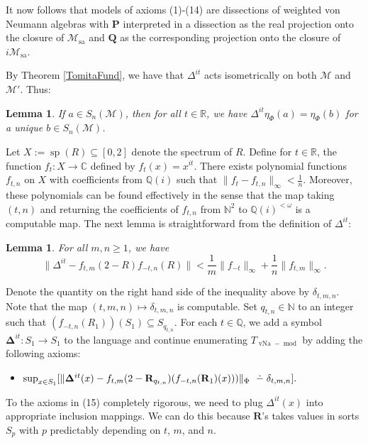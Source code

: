 \documentclass[12pt]{amsart}
\newtheorem{lem}[thm]{Lemma}
\theoremstyle{definition}
\newcommand{\dminus}{ 
\buildrel\textstyle\ .\over{\hbox{ 
\vrule height3pt depth0pt width0pt}{\smash-} 
}}
\def\cal{\mathcal}
\def \md{\operatorname{mod}}
\DeclareMathOperator{\vNa}{vNa}
\DeclareMathOperator{\spec}{sp}
\def \sa{\operatorname{sa}}
\def \vP{\mathbf{P}}
\def \vQ{\mathbf{Q}}
\def \vR{\mathbf{R}}
\def \bbC{\mathbb{C}}
\def \bbR{\mathbb{R}}
\def \bbQ{\mathbb{Q}}
\def \bbN{\mathbb{N}}
\begin{document}
It now follows that models of axioms (1)-(14) are dissections of weighted von Neumann algebras with $\vP$ interpreted in a dissection as the real projection onto the closure of $\cal M_{\sa}$ and $\vQ$ as the corresponding projection onto the closure of $i\cal M_{\sa}$. 

By Theorem \ref{TomitaFund}, we have that $\Delta^{it}$ acts isometrically on both $\cal M$ and $\cal M'$. Thus:

\begin{lem}
    If $a\in S_n(\cal M)$, then for all $t\in \bbR$, we have $\Delta^{it} \eta_{\Phi}(a) = \eta_{\Phi}(b)$ for a unique $b \in S_n(\cal M)$.
\end{lem}

Let $X := \spec (R) \subseteq [0,2]$ denote the spectrum of $R$.  Define for $t \in \bbR$, the function $f_t : X \to \bbC$ defined by $f_t(x) = x^{it}$.  There exists polynomial functions $f_{t,n}$ on $X$ with coefficients from $\bbQ(i)$ such that $\|f_t - f_{t,n}\|_\infty < \frac{1}{n}$.  Moreover, these polynomials can be found effectively in the sense that the map taking $(t,n)$ and returning the coefficients of $f_{t,n}$ from $\bbN^2$ to $\bbQ(i)^{<\omega}$ is a computable map.  The next lemma is straightforward from the definition of $\Delta^{it}$:

\begin{lem}
    For all $m,n\geq 1$, we have
    $$\|\Delta^{it} - f_{t,m}(2-R)f_{-t,n}(R)\| < \frac{1}{m}\|f_{-t}\|_\infty + \frac{1}{n}\|f_{t,m}\|_\infty.$$
\end{lem}

Denote the quantity on the right hand side of the inequality above by $\delta_{t,m,n}$. Note that the map $(t,m,n)\mapsto \delta_{t,m,n}$ is computable.  Set $q_{t,n}\in \bbN$ to an integer such that $(f_{-t,n}(R_1))(S_1) \subseteq S_{q_{t,n}}$.  For each $t \in \bbQ$, we add a symbol $\mathbf{\Delta}^{it} : S_1 \to S_1$ to the language and continue enumerating $T_{\vNa-\md}$ by adding the following axioms:

\begin{itemize}
    \item[(15)] $\sup_{x\in S_1}[\|\mathbf{\Delta}^{it}(x)-f_{t,m}(2-\vR_{q_{t,n}})(f_{-t,n}(\vR_1)(x)))\|_\Phi \dminus \delta_{t,m,n}].$
\end{itemize}

To the axioms in (15) completely rigorous, we need to plug $\Delta^{it}(x)$ into appropriate inclusion mappings.  We can do this because $\vR$'s takes values in sorts $S_p$ with $p$ predictably depending on $t$, $m$, and $n$.
\end{document}
